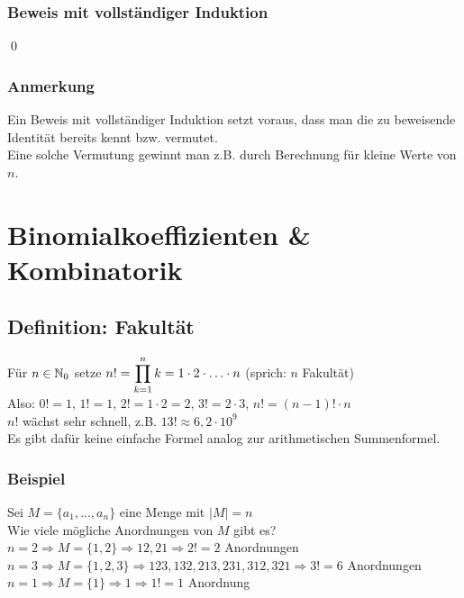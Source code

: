 \subsection*{Beweis mit vollständiger Induktion}
\qed

\subsection*{Anmerkung}
Ein Beweis mit vollständiger Induktion setzt voraus, dass man die zu beweisende Identität bereits kennt bzw. vermutet.\\
Eine solche Vermutung gewinnt man z.B. durch Berechnung für kleine Werte von $n$.

\newpage

{}
\chapter*{Binomialkoeffizienten \& Kombinatorik}

\section{Definition: Fakultät}\label{2.5}
Für $n \in \mathbb{N}_0$ setze $n! = \displaystyle\prod_{k=1}^n k = 1 \cdot 2 \cdot \hdots \cdot n$ (sprich: $n$ Fakultät)\\
Also: $0!=1$, $1!=1$, $2!=1 \cdot 2 = 2$, $3!=2 \cdot 3$, $n!=(n-1)! \cdot n$\\
$n!$ wächst sehr schnell, z.B. $13! \approx 6{,}2 \cdot 10^9$\\
Es gibt dafür keine einfache Formel analog zur arithmetischen Summenformel.

\subsection*{Beispiel}
Sei $M=\{a_1 , ... , a_n\}$ eine Menge mit $|M|=n$\\
Wie viele mögliche Anordnungen von $M$ gibt es?\\
$n=2 \Rightarrow M=\{1,2\} \Rightarrow 12, 21 \Rightarrow 2!=2$ Anordnungen\\
$n=3 \Rightarrow M=\{1,2,3\} \Rightarrow 123, 132, 213, 231, 312, 321 \Rightarrow 3!=6$ Anordnungen\\
$n=1 \Rightarrow M=\{1\} \Rightarrow 1 \Rightarrow 1!=1$ Anordnung

